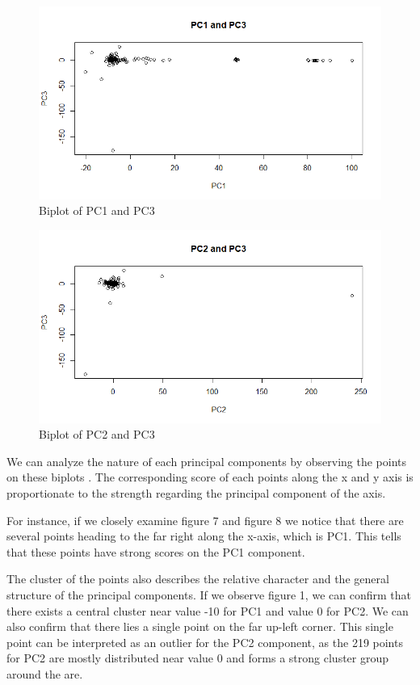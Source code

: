 \begin{figure}[H]
    \centering
    \includegraphics[width=12cm]{images/PCA/PC1 and PC3.png}
    \caption{Biplot of PC1 and PC3}
    \label{fig:PCA13biplot} 
\end{figure}

\begin{figure}[H]
    \centering
    \includegraphics[width=12cm]{images/PCA/PC2 and PC3.png}
    \caption{Biplot of PC2 and PC3}
    \label{fig:PCA23biplotd} 
\end{figure}

We can analyze the nature of each principal components by observing the points on these biplots \cite{PCAbiplot}. The corresponding score of each points along the x and y axis is proportionate to the strength regarding the principal component of the axis. 

For instance, if we closely examine figure 7 and figure 8 we notice that there are several points heading to the far right along the x-axis, which is PC1. This tells that these points have strong scores on the PC1 component. 

The cluster of the points also describes the relative character and the general structure of the principal components. If we observe figure 1, we can confirm that there exists a central cluster near value -10 for PC1 and value 0 for PC2. We can also confirm that there lies a single point on the far up-left corner. This single point can be interpreted as an outlier for the PC2 component, as the 219 points for PC2 are mostly distributed near value 0 and forms a strong cluster group around the are.

